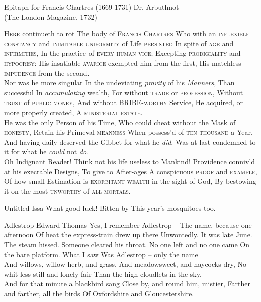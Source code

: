 \begin{poem}
{Epitaph for Francis Chartres (1669-1731)}
{Dr. Arbuthnot\\
(The London Magazine, 1732)}

\textsc{Here} continueth to rot
 The body of \textsc{Francis} \textsc{Chartres}
 Who with an \textsc{inflexible constancy}
\Indent and \textsc{inimitable uniformity} of Life  \textsc{persisted}
 In spite of \textsc{age} and \textsc{infirmities},
 In the practice of \textsc{every human vice};
 Excepting \textsc{prodigiality} and \textsc{hypocrisy}:
 His insatiable \textsc{avarice} exempted him from the first,
 His matchless \textsc{impudence} from the second.\\
\Indent Nor was he more singular
 In the undeviating \emph{pravity} of his \emph{Manners},
 Than successful
 In \emph{accumulating} wealth,
 For without \textsc{trade} or \textsc{profession},
 Without \textsc{trust} of \textsc{public money},
 And without \textsc{BRIBE-worthy} Service,
 He acquired, or more properly created,
 A \textsc{ministerial estate}.\\
\Indent He was the only Person of his Time,
 Who could cheat without the Mask of \textsc{honesty},
 Retain his Primeval \textsc{meanness}
 When possess'd of \textsc{ten thousand} a Year,
 And having daily deserved the Gibbet for what he \emph{did},
 Was at last condemned to it for what he \emph{could} not \emph{do}.\\
\Indent Oh Indignant Reader!
 Think not his life useless to Mankind!
 Providence conniv'd at his execrable Designs,
 To give to After-ages
 A conspicuous \textsc{proof} and \textsc{example},
 Of how small Estimation is \textsc{exorbitant wealth} in the sight of God,
 By bestowing it on the most \textsc{unworthy} of \textsc{all mortals}.
\end{poem}

\begin{poem}
  {Untitled}
  {Issa}
  What good luck!
  Bitten by
  This year's mosquitoes too.
\end{poem}

\begin{poem}
   {Adlestrop}
   {Edward Thomas}
 Yes, I remember Adlestrop --
 The name, because one afternoon
 Of heat the express-train drew up there
 Unwontedly. It was late June. \\

 The steam hissed. Someone cleared his throat.
 No one left and no one came
 On the bare platform. What I saw
 Was Adlestrop -- only the name \\

 And willows, willow-herb, and grass,
 And meadowsweet, and haycocks dry,
 No whit less still and lonely fair
 Than the high cloudlets in the sky.\\ 

 And for that minute a blackbird sang
 Close by, and round him, mistier,
 Farther and farther, all the birds
 Of Oxfordshire and Gloucestershire.
\end{poem}

